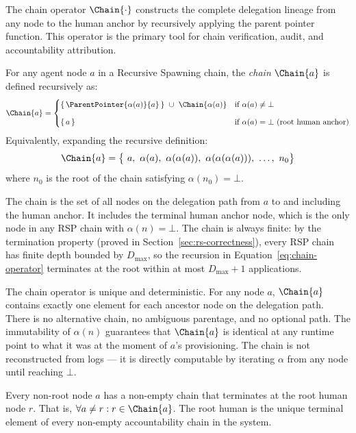 The chain operator $\Chain{\cdot}$ constructs the complete delegation lineage from any node to the human anchor by recursively applying the parent pointer function. This operator is the primary tool for chain verification, audit, and accountability attribution.

\begin{dfn}\label{def:chain-operator}
For any agent node $a$ in a Recursive Spawning chain, the \emph{chain} $\Chain{a}$ is defined recursively as:
\begin{equation}
\Chain{a} =
\begin{cases}
\{\, \ParentPointer{\alpha(a)}{a} \, \} \ \cup \ \Chain{\alpha(a)} & \text{if } \alpha(a) \neq \bot \\[8pt]
\{\, a \,\} & \text{if } \alpha(a) = \bot \ \text{(root human anchor)}
\end{cases}
\label{eq:chain-operator}
\end{equation}
Equivalently, expanding the recursive definition:
\begin{equation}
\Chain{a} = \bigl\{\ a,\ \alpha(a),\ \alpha(\alpha(a)),\ \alpha(\alpha(\alpha(a))),\ \ldots,\ n_0 \bigr\}
\label{eq:chain-expanded}
\end{equation}
where $n_0$ is the root of the chain satisfying $\alpha(n_0) = \bot$.
\end{dfn}

The chain is the set of all nodes on the delegation path from $a$ to and including the human anchor. It includes the terminal human anchor node, which is the only node in any RSP chain with $\alpha(n) = \bot$. The chain is always finite: by the termination property (proved in Section~\ref{sec:rs-correctness}), every RSP chain has finite depth bounded by $D_{\max}$, so the recursion in Equation~\ref{eq:chain-operator} terminates at the root within at most $D_{\max} + 1$ applications.

The chain operator is unique and deterministic. For any node $a$, $\Chain{a}$ contains exactly one element for each ancestor node on the delegation path. There is no alternative chain, no ambiguous parentage, and no optional path. The immutability of $\alpha(n)$ guarantees that $\Chain{a}$ is identical at any runtime point to what it was at the moment of $a$'s provisioning. The chain is not reconstructed from logs — it is directly computable by iterating $\alpha$ from any node until reaching $\bot$.

\begin{corrollary}\label{cor:unique-human-termination}
Every non-root node $a$ has a non-empty chain that terminates at the root human node $r$. That is, $\forall a \neq r: r \in \Chain{a}$. The root human is the unique terminal element of every non-empty accountability chain in the system.
\end{corrollary}

